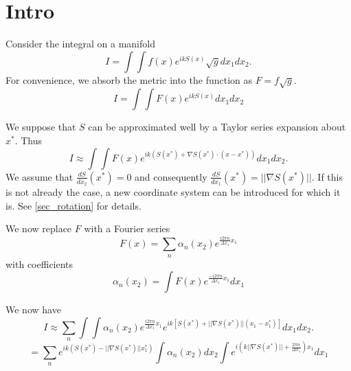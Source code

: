 \documentclass{article}
\newcommand{\norm}[1]{||#1||}
\theoremstyle{plain}
\begin{document}


\section{Intro}\label{sec_intro}

Consider the integral on a manifold
\begin{equation}
	I = \int\int f(x) e^{ikS(x)} \sqrt{g} dx_1dx_2.
\end{equation}
For convenience, we absorb the metric into the function as  $F = f\sqrt{g}$.
\begin{equation}
	I = \int\int F(x) e^{ikS(x)} dx_1dx_2
\end{equation}



We suppose that $S$ can be approximated well by a Taylor series expansion about $x^*$.
Thus
\begin{equation}
	I \approx \int\int F(x) e^{ik\left(S(x^*) + \nabla S(x^*)\cdot (x-x^*) \right)} dx_1dx_2.
\end{equation}
We assume that $\frac{dS}{dx_2}(x^*) = 0$ and consequently $\frac{dS}{dx_1}(x^*) = \norm{\nabla S(x^*)}$.
If this is not already the case, a new coordinate system can be introduced for which it is. See \ref{sec_rotation} for details.


We now replace $F$ with a Fourier series
\begin{equation}
	F(x) = \sum_n \alpha_n(x_2) e^{ \frac{i2\pi n}{ \Delta x_1}x_1 }
\end{equation}
with coefficients
\begin{equation}
	\alpha_n(x_2) = \int F(x) e^{ \frac{-i2\pi n}{ \Delta x_1}x_1 } dx_1
\end{equation}


We now have
\begin{equation}
	I \approx \sum_n \int\int \alpha_n(x_2) e^{ \frac{i2\pi n}{ \Delta x_1 }x_1 }
	e^{ik\left[S(x^*) + \norm{\nabla S(x^*)}(x_1-x_1^*) \right]} dx_1dx_2.
\end{equation}
\begin{equation}
	= \sum_n e^{ik \left( S(x^*) - \norm{\nabla S(x^*)}x_1^* \right)} 
	\int \alpha_n(x_2) dx_2 
	\int e^{ i\left( k\norm{\nabla S(x^*)} + \frac{2\pi n}{ \Delta x_1 }\right) x_1 } dx_1
\end{equation}
\end{document}
